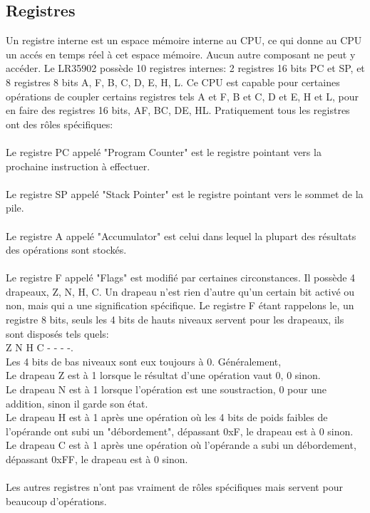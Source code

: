 \documentclass{report}
\begin{document}
\subsection{Registres}

Un registre interne est un espace mémoire interne au CPU, ce qui donne au CPU un accés en temps réel à cet espace mémoire. Aucun autre composant ne peut y accéder.
Le LR35902 possède 10 registres internes: 2 registres 16 bits PC et SP, et 8 registres 8 bits A, F, B, C, D, E, H, L.
Ce CPU est capable pour certaines opérations de coupler certains registres tels A et F, B et C, D et E, H et L, pour en faire des registres 16 bits, AF, BC, DE, HL.
Pratiquement tous les registres ont des rôles spécifiques:\\\\
Le registre PC appelé "Program Counter" est le registre pointant vers la prochaine instruction à effectuer.\\\\
Le registre SP appelé "Stack Pointer" est le registre pointant vers le sommet de la pile.\\\\
Le registre A appelé "Accumulator" est celui dans lequel la plupart des résultats des opérations sont stockés.\\\\
Le registre F appelé "Flags" est modifié par certaines circonstances.
Il possède 4 drapeaux, Z, N, H, C. Un drapeau n'est rien d'autre qu'un certain bit activé ou non, mais qui a une signification spécifique.
Le registre F étant rappelons le, un registre 8 bits, seuls les 4 bits de hauts niveaux servent pour les drapeaux, 
ils sont disposés tels quels: \\Z N H C - - - -.\\Les 4 bits de bas niveaux sont eux toujours à 0.
Généralement, \\Le drapeau Z est à 1 lorsque le résultat d'une opération vaut 0, 0 sinon.\\
Le drapeau N est à 1 lorsque l'opération est une soustraction, 0 pour une addition, sinon il garde son état.\\
Le drapeau H est à 1 après une opération où les 4 bits de poids faibles de l'opérande ont subi un "débordement", dépassant 0xF, le drapeau est à 0 sinon.\\
Le drapeau C est à 1 après une opération où l'opérande a subi un débordement, dépassant 0xFF, le drapeau est à 0 sinon.\\\\
Les autres registres n'ont pas vraiment de rôles spécifiques mais servent pour beaucoup d'opérations.
\end{document}
